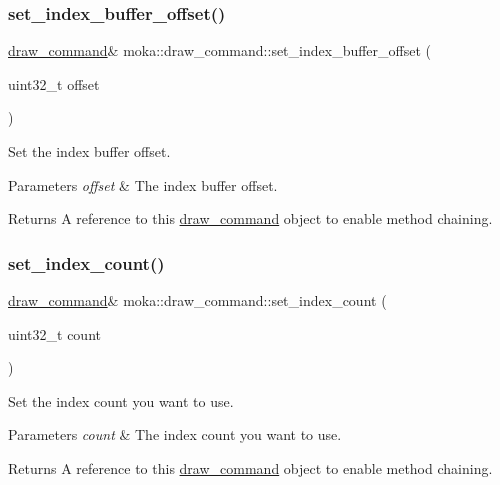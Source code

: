 \subsubsection{\texorpdfstring{set\_index\_buffer\_offset()}{set\_index\_buffer\_offset()}}
{\footnotesize\ttfamily \mbox{\hyperlink{classmoka_1_1draw__command}{draw\+\_\+command}}\& moka\+::draw\+\_\+command\+::set\+\_\+index\+\_\+buffer\+\_\+offset (\begin{DoxyParamCaption}\item[{uint32\+\_\+t}]{offset }\end{DoxyParamCaption})}



Set the index buffer offset. 


\begin{DoxyParams}{Parameters}
{\em offset} & The index buffer offset. \\
\hline
\end{DoxyParams}
\begin{DoxyReturn}{Returns}
A reference to this \mbox{\hyperlink{classmoka_1_1draw__command}{draw\+\_\+command}} object to enable method chaining. 
\end{DoxyReturn}
\mbox{\label{classmoka_1_1draw__command_a4de8e124e795f7c588803db28f95f518}} 
\subsubsection{\texorpdfstring{set\_index\_count()}{set\_index\_count()}}
{\footnotesize\ttfamily \mbox{\hyperlink{classmoka_1_1draw__command}{draw\+\_\+command}}\& moka\+::draw\+\_\+command\+::set\+\_\+index\+\_\+count (\begin{DoxyParamCaption}\item[{uint32\+\_\+t}]{count }\end{DoxyParamCaption})}



Set the index count you want to use. 


\begin{DoxyParams}{Parameters}
{\em count} & The index count you want to use. \\
\hline
\end{DoxyParams}
\begin{DoxyReturn}{Returns}
A reference to this \mbox{\hyperlink{classmoka_1_1draw__command}{draw\+\_\+command}} object to enable method chaining. 
\end{DoxyReturn}
\mbox{\label{classmoka_1_1draw__command_a230602d634bec814c10af3c145bb2a5f}} 
